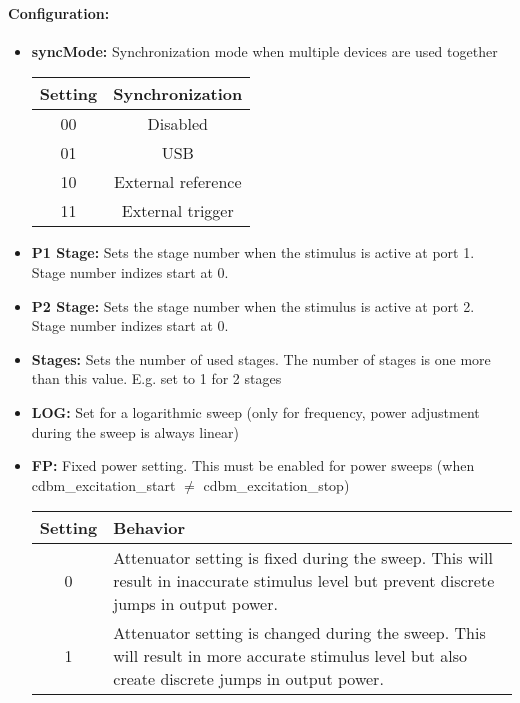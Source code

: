\documentclass[a4paper,11pt]{article}
\newcommand{\bitrect}[2]{
  \begin{pgfonlayer}{foreground}
    \draw [thick] (0,0) rectangle (#1,1);
    \pgfmathsetmacro\result{#1-1}
    \foreach \x in {1,...,\result}
      \draw [thick] (\x,1) -- (\x, 0.8);
  \end{pgfonlayer}
  \bitlabels{#1}{#2}
}
\newcommand{\rwbits}[3]{
  \draw [thick] (#1,0) rectangle ++(#2,1) node[pos=0.5]{#3};
  \pgfmathsetmacro\start{#1+0.5}
  \pgfmathsetmacro\finish{#1+#2-0.5}
}
\newcommand{\robits}[3]{
  \begin{pgfonlayer}{background}
    \draw [thick, fill=lightgray] (#1,0) rectangle ++(#2,1) node[pos=0.5]{#3};
  \end{pgfonlayer}
  \pgfmathsetmacro\start{#1+0.5}
  \pgfmathsetmacro\finish{#1+#2-0.5}
}
\newcommand{\bitlabels}[2]{
  \foreach \bit in {1,...,#1}{
     \pgfmathsetmacro\result{#2}
     \node [above] at (\bit-0.5, 1) {\pgfmathprintnumber{\result}};
   }
}
\begin{document}
\paragraph{Configuration:}
\begin{center}
\end{center}
\begin{itemize}
\item \textbf{syncMode:} Synchronization mode when multiple devices are used together
\begin{center}
\begin{tabular}{ c|c }
Setting & Synchronization\\
 \hline
00 & Disabled \\
01 & USB\\
10 & External reference\\
11 & External trigger\\
\end{tabular}
\end{center}
\item \textbf{P1 Stage:} Sets the stage number when the stimulus is active at port 1. Stage number indizes start at 0.
\item \textbf{P2 Stage:} Sets the stage number when the stimulus is active at port 2. Stage number indizes start at 0.
\item \textbf{Stages:} Sets the number of used stages. The number of stages is one more than this value. E.g. set to 1 for 2 stages
\item \textbf{LOG:} Set for a logarithmic sweep (only for frequency, power adjustment during the sweep is always linear)
\item \textbf{FP:} Fixed power setting. This must be enabled for power sweeps (when  cdbm\_excitation\_start $\neq$  cdbm\_excitation\_stop)
\begin{center}
\begin{tabularx}{\textwidth}{ c|X }
Setting & Behavior\\
 \hline
0 & Attenuator setting is fixed during the sweep. This will result in inaccurate stimulus level but prevent discrete jumps in output power. \\
1 & Attenuator setting is changed during the sweep. This will result in more accurate stimulus level but also create discrete jumps in output power. \\

\end{tabularx}
\end{center}
\end{itemize}
\end{document}
